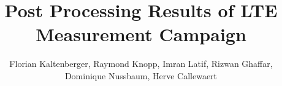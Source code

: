 \documentclass[a4paper,10pt]{article}
\title{Post Processing Results of LTE Measurement Campaign}
\author{Florian Kaltenberger, Raymond Knopp, Imran Latif, Rizwan Ghaffar,\\ 
Dominique Nussbaum, Herve Callewaert}
\newcommand{\printfile}[2][]{
 \begin{minipage}{8cm}
  \centering
  \texttt{[image: /extras/kaltenbe/CNES/emos\_postprocessed\_data/\#2]}
  \url{#2}: #1

 \end{minipage}
}
\begin{document}
\maketitle

\tableofcontents

\pagebreak

% 
% 
% 
% 
% 
% 
% 
% 
% 
% 
\end{document}
